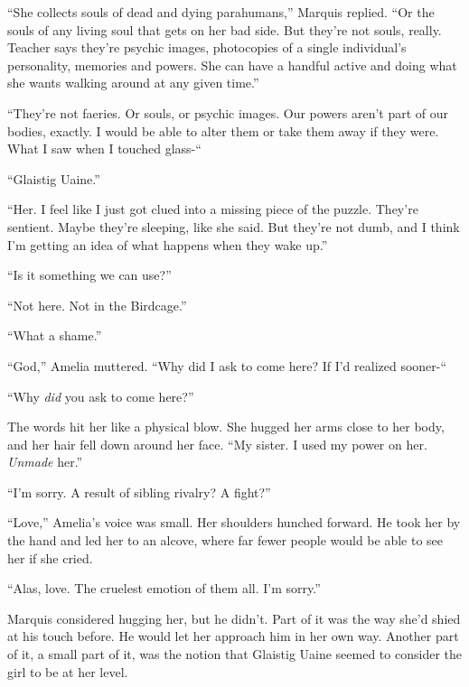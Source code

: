 ``She collects souls of dead and dying parahumans,'' Marquis replied.  ``Or the souls of any living soul that gets on her bad side.  But they're not souls, really.  Teacher says they're psychic images, photocopies of a single individual's personality, memories and powers.  She can have a handful active and doing what she wants walking around at any given time.''



``They're not faeries.  Or souls, or psychic images.  Our powers aren't part of our bodies, exactly.  I would be able to alter them or take them away if they were.  What I saw when I touched glass-``



``Glaistig Uaine.''



``Her.  I feel like I just got clued into a missing piece of the puzzle.  They're sentient.  Maybe they're sleeping, like she said.  But they're not dumb, and I think I'm getting an idea of what happens when they wake up.''



``Is it something we can use?''



``Not here.  Not in the Birdcage.''



``What a shame.''



``God,'' Amelia muttered.  ``Why did I ask to come here?  If I'd realized sooner-``



``Why \emph{did} you ask to come here?''



The words hit her like a physical blow.  She hugged her arms close to her body, and her hair fell down around her face.  ``My sister.  I used my power on her.  \emph{Unmade} her.''



``I'm sorry.  A result of sibling rivalry?  A fight?''



``Love,'' Amelia's voice was small.  Her shoulders hunched forward.  He took her by the hand and led her to an alcove, where far fewer people would be able to see her if she cried.



``Alas, love.  The cruelest emotion of them all.  I'm sorry.''



Marquis considered hugging her, but he didn't.  Part of it was the way she'd shied at his touch before.  He would let her approach him in her own way.  Another part of it, a small part of it, was the notion that Glaistig Uaine seemed to consider the girl to be at her level.




